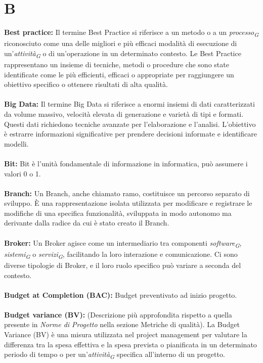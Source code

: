 \documentclass{article}
\begin{document}
\section*{B}
{}
\textbf{Best practice:} Il termine Best Practice si riferisce a un metodo o a un \textit{processo}\textsubscript{\textit{G}} riconosciuto come una delle migliori e più efficaci modalità di esecuzione di un'\textit{attività}\textsubscript{\textit{G}} o di un'operazione in un determinato contesto. Le Best Practice rappresentano un insieme di tecniche, metodi o procedure che sono state identificate come le più efficienti, efficaci o appropriate per raggiungere un obiettivo specifico o ottenere risultati di alta qualità.
\\
\\
\textbf{Big Data:} Il termine Big Data si riferisce a enormi insiemi di dati caratterizzati da volume massivo, velocità elevata di generazione e varietà di tipi e formati. Questi dati richiedono tecniche avanzate per l'elaborazione e l'analisi. L'obiettivo è estrarre informazioni significative per prendere decisioni informate e identificare modelli.
\\
\\
\textbf{Bit:} Bit è l'unità fondamentale di informazione in informatica, può assumere i valori 0 o 1. 
\\
\\
\textbf{Branch:} Un Branch, anche chiamato ramo, costituisce un percorso separato di sviluppo. È una rappresentazione isolata utilizzata per modificare e registrare le modifiche di una specifica funzionalità, sviluppata in modo autonomo ma derivante dalla radice da cui è stato creato il Branch.
\\
\\
\textbf{Broker:} Un Broker agisce come un intermediario tra componenti \textit{software}\textsubscript{\textit{G}}, \textit{sistemi}\textsubscript{\textit{G}} o \textit{servizi}\textsubscript{\textit{G}}, facilitando la loro interazione e comunicazione. Ci sono diverse tipologie di Broker, e il loro ruolo specifico può variare a seconda del contesto.
\\
\\
\textbf{Budget at Completion (BAC):} Budget preventivato ad inizio progetto.
\\
\\
\textbf{Budget variance (BV):} 
(Descrizione più approfondita rispetto a quella presente in \textit{Norme di Progetto} nella sezione Metriche di qualità).
La Budget Variance (BV) è una misura utilizzata nel project management per valutare la differenza tra la spesa effettiva e la spesa prevista o pianificata in un determinato periodo di tempo o per un'\textit{attività}\textsubscript{\textit{G}} specifica all'interno di un progetto.
\pagebreak
\end{document}
